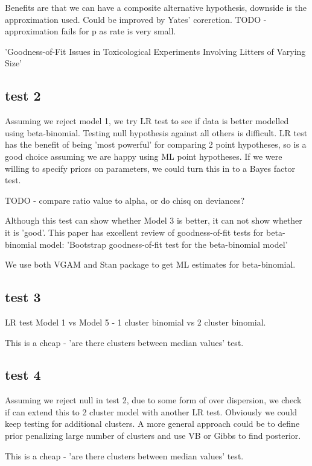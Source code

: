 \documentclass[11pt,a4,singlespacing,titlepagenumber=on]{scrreprt}
\numberwithin{equation}{chapter} %
\theoremstyle{remark}
\begin{document}
Benefits are that we can have a composite alternative hypothesis, downside is the approximation used. Could be improved by Yates' corerction. TODO - approximation fails for p as rate is very small.

'Goodness-of-Fit Issues in Toxicological Experiments Involving Litters of Varying Size'

\subsection{test 2}

Assuming we reject model 1, we try LR test to see if data is better modelled using beta-binomial. Testing null hypothesis against all others is difficult. LR test has the benefit of being 'most powerful' for comparing 2 point hypotheses, so is a good choice assuming we are happy using ML point hypotheses. If we were willing to specify priors on parameters, we could turn this in to a Bayes factor test.

TODO - compare ratio value to alpha, or do chisq on deviances?

Although this test can show whether Model 3 is better, it can not show whether it is 'good'. This paper has excellent review of goodness-of-fit tests for beta-binomial model:
'Bootstrap goodness-of-fit test for the beta-binomial model'

We use both VGAM and Stan package to get ML estimates for beta-binomial.

\subsection{test 3}

LR test Model 1 vs Model 5 - 1 cluster binomial vs 2 cluster binomial. 

This is a cheap - 'are there clusters between median values' test. 

\subsection{test 4}

Assuming we reject null in test 2, due to some form of over dispersion, we check if can extend this to 2 cluster model with another LR test. Obviously we could keep testing for additional clusters. A more general approach could be to define prior penalizing large number of clusters and use VB or Gibbs to find posterior.

This is a cheap - 'are there clusters between median values' test. 
\end{document}
